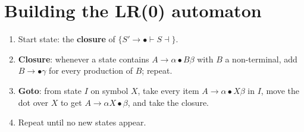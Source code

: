 \section{Building the LR(0) automaton}

\begin{enumerate}
  \item Start state: the \textbf{closure} of $\{S' \to \bullet \vdash S\dashv\}$.
  \item \textbf{Closure}: whenever a state contains $A \to \alpha\bullet B\beta$ with $B$ a
        non-terminal, add $B \to \bullet\gamma$ for every production of $B$; repeat.
  \item \textbf{Goto}: from state $I$ on symbol $X$, take every item $A\to\alpha\bullet X\beta$
        in $I$, move the dot over $X$ to get $A\to\alpha X\bullet\beta$, and take the closure.
  \item Repeat until no new states appear.
\end{enumerate}

